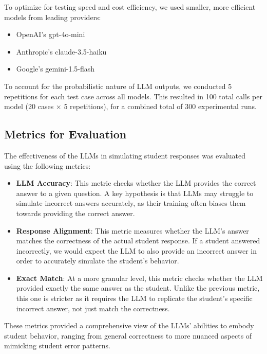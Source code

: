 \documentclass[
    a4paper, %
    10pt, %
    twoside, %
]{LTJournalArticle}
\begin{document}
To optimize for testing speed and cost efficiency, we used smaller, more efficient models from leading providers:
\begin{itemize}
    \item OpenAI's gpt-4o-mini
    \item Anthropic's claude-3.5-haiku
    \item Google's gemini-1.5-flash
\end{itemize}

To account for the probabilistic nature of LLM outputs, we conducted 5 repetitions for each test case across all models. This resulted in 100 total calls per model (20 cases × 5 repetitions), for a combined total of 300 experimental runs.

\subsection{Metrics for Evaluation}
The effectiveness of the LLMs in simulating student responses was evaluated using the following metrics:

\begin{itemize}
    \item \textbf{LLM Accuracy}: This metric checks whether the LLM provides the correct answer to a given question. A key hypothesis is that LLMs may struggle to simulate incorrect answers accurately, as their training often biases them towards providing the correct answer.
    \item \textbf{Response Alignment}: This metric measures whether the LLM's answer matches the correctness of the actual student response. If a student answered incorrectly, we would expect the LLM to also provide an incorrect answer in order to accurately simulate the student's behavior.
    \item \textbf{Exact Match}: At a more granular level, this metric checks whether the LLM provided exactly the same answer as the student. Unlike the previous metric, this one is stricter as it requires the LLM to replicate the student's specific incorrect answer, not just match the correctness.
\end{itemize}

These metrics provided a comprehensive view of the LLMs' abilities to embody student behavior, ranging from general correctness to more nuanced aspects of mimicking student error patterns.

\end{document}
